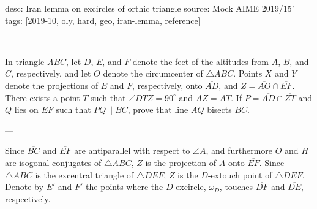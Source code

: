 desc: Iran lemma on excircles of orthic triangle
source: Mock AIME 2019/15'
tags: [2019-10, oly, hard, geo, iran-lemma, reference]

---

In triangle $ABC$, let $D$, $E$, and $F$ denote the feet of the altitudes from $A$, $B$, and $C$, respectively, and let $O$ denote the circumcenter of $\triangle ABC$. Points $X$ and $Y$ denote the projections of $E$ and $F$, respectively, onto $\overline{AD}$, and $Z=\overline{AO}\cap\overline{EF}$. There exists a point $T$ such that $\angle DTZ=90^\circ$ and $AZ=AT$. If $P=\overline{AD}\cap\overline{ZT}$ and $Q$ lies on $\overline{EF}$ such that $\overline{PQ}\parallel\overline{BC}$, prove that line $AQ$ bisects $\overline{BC}$.

---

Since $\overline{BC}$ and $\overline{EF}$ are antiparallel with respect to $\angle A$, and furthermore $O$ and $H$ are isogonal conjugates of $\triangle ABC$, $Z$ is the projection of $A$ onto $\overline{EF}$. Since $\triangle ABC$ is the excentral triangle of $\triangle DEF$, $Z$ is the $D$-extouch point of $\triangle DEF$. Denote by $E'$ and $F'$ the points where the $D$-excircle, $\omega_D$, touches $\overline{DF}$ and $\overline{DE}$, respectively.
